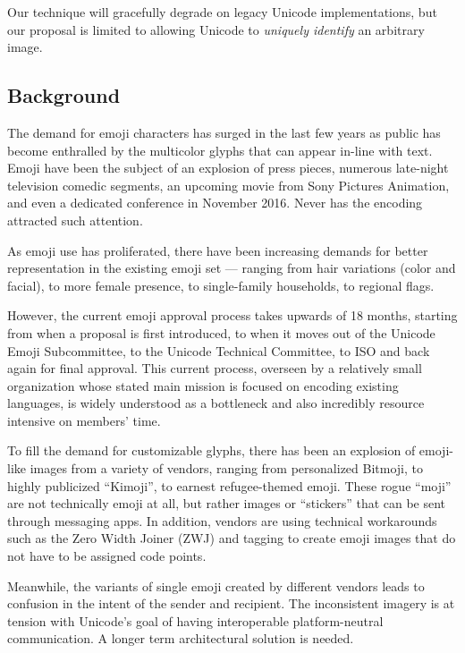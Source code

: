 \documentclass[12pt]{article}
\begin{document}
Our technique will gracefully degrade on legacy Unicode
implementations, but our proposal is limited to allowing Unicode to
\emph{uniquely identify} an arbitrary image.


  \subsection{Background} 

The demand for emoji characters has surged in the last few years as public has become enthralled by the multicolor glyphs that can appear in-line with text. Emoji have been the subject of an explosion of press pieces, numerous late-night television comedic segments, an upcoming movie from Sony Pictures Animation, and even a dedicated conference in November 2016. Never has the encoding attracted such attention.

As emoji use has proliferated, there have been increasing demands for better representation in the existing emoji set — ranging from hair variations (color and facial), to more female presence, to single-family households, to regional flags.\autocite{UTR52}

However, the current emoji approval process takes upwards of 18 months, starting from when a proposal is first introduced, to when it moves out of the Unicode Emoji Subcommittee, to the Unicode Technical Committee, to ISO and back again for final approval. This current process, overseen by a relatively small organization whose stated main mission is focused on encoding existing languages, is widely understood as a bottleneck and also incredibly resource intensive on members’ time.

To fill the demand for customizable glyphs, there has been an explosion of emoji-like images from a variety of vendors, ranging from personalized Bitmoji, to highly publicized “Kimoji”, to earnest refugee-themed emoji. These rogue “moji” are not technically emoji at all, but rather images or “stickers” that can be sent through messaging apps. In addition, vendors are using technical workarounds such as the Zero Width Joiner (ZWJ) and tagging to create emoji images that do not have to be assigned code points.

Meanwhile, the variants of single emoji created by different vendors leads to confusion in the intent of the sender and recipient.\autocite{EmojiVarying} The inconsistent imagery is at tension with Unicode’s goal of having interoperable platform-neutral communication. 
A longer term architectural solution is needed. 
\end{document}
